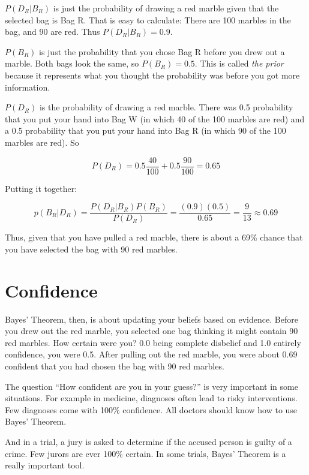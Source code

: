 $P(D_R | B_R)$ is just the probability of drawing a red marble given that the
selected bag is Bag R. That is easy to calculate: There are 100
marbles in the bag, and 90 are red. Thus $P(D_R | B_R) = 0.9$.

$P(B_R)$ is just the probability that you chose Bag R before you drew
out a marble. Both bags look the same, so $P(B_R)= 0.5$. This is
called \textit{the prior} because it represents what you thought the
probability was before you got more information.

$P(D_R)$ is the probability of drawing a red marble. There was 0.5
probability that you put your hand into Bag W (in which 40 of the 100
marbles are red) and a 0.5 probability that you put your hand into Bag
R (in which 90 of the 100 marbles are red).  So

$$P(D_R) = 0.5 \frac{40}{100} + 0.5 \frac{90}{100} = 0.65$$

Putting it together:

$$p(B_R | D_R) = \frac{ P(D_R | B_R) P(B_R) } {P(D_R)} = \frac{(0.9)(0.5)}{0.65} = \frac{9}{13} \approx 0.69$$

Thus, given that you have pulled a red marble, there is about a 69\% chance
that you have selected the bag with 90 red marbles.

\section{Confidence}

Bayes' Theorem, then, is about updating your beliefs based on
evidence.  Before you drew out the red marble, you selected one bag
thinking it might contain 90 red marbles. How certain were you? 0.0 being complete disbelief and 1.0 entirely
confidence, you were 0.5. After pulling out the red marble, you were about 0.69
confident that you had chosen the bag with 90 red marbles.

The question ``How confident are you in your guess?'' is very
important in some situations. For example in medicine, diagnoses often
lead to risky interventions. Few diagnoses come with 100\% confidence.
All doctors should know how to use Bayes' Theorem. 

And in a trial, a jury is asked to determine if the accused person is
guilty of a crime. Few jurors are ever 100\% certain. In some trials, Bayes'
Theorem is a really important tool.

